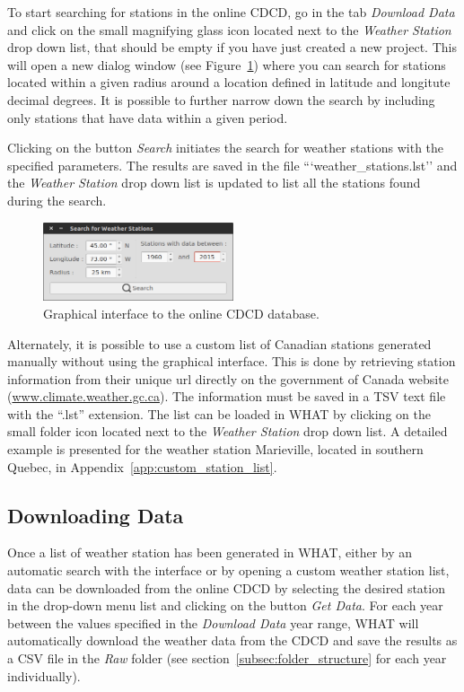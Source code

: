 \documentclass[WHATMANUAL.tex]{subfiles}
\begin{document}
To start searching for stations in the online CDCD, go in the tab \emph{Download Data} and click on the small magnifying glass icon located next to the \emph{Weather Station} drop down list, that should be empty if you have just created a new project. This will open a new dialog window (see Figure~\ref{fig:Screenshot_search4stations}) where you can search for stations located within a given radius around a location defined in latitude and longitute decimal degrees. It is possible to further narrow down the search by including only stations that have data within a given period. 

Clicking on the button \emph{Search} initiates the search for weather stations with the specified parameters. The results are saved in the file ```weather\_stations.lst'' and the \emph{Weather Station} drop down list is updated to list all the stations found during the search.

\begin{figure}[!ht]
\centering
\includegraphics[width=0.5\textwidth]{img/WHAT_Screenshot_search4stations}
\caption[Graphical interface to the online CDCD database.]{Graphical interface to the online CDCD database.}
\label{fig:Screenshot_search4stations}
\end{figure}

Alternately, it is possible to use a custom list of Canadian stations generated manually without using the graphical interface. This is done by retrieving station information from their unique url directly on the government of Canada website (\url{www.climate.weather.gc.ca}). The information must be saved in a TSV text file with the ``.lst'' extension. The list can be loaded in WHAT by clicking on the small folder icon located next to the \emph{Weather Station} drop down list. A detailed example is presented for the weather station Marieville, located in southern Quebec, in Appendix~\ref{app:custom_station_list}.

\subsection{Downloading Data}

Once a list of weather station has been generated in WHAT, either by an automatic search with the interface or by opening a custom weather station list, data can be downloaded from the online CDCD by selecting the desired station in the drop-down menu list and clicking on the button \emph{Get Data}. For each year between the values specified in the \emph{Download Data} year range, WHAT will automatically download the weather data from the CDCD and save the results as a CSV file in the \emph{Raw} folder (see section~\ref{subsec:folder_structure} for each year individually).
\end{document}
